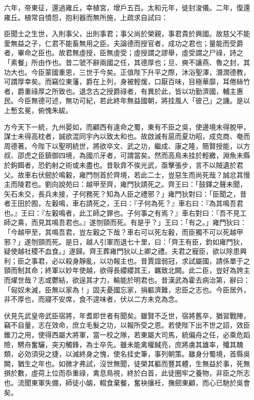 \begin{pinyinscope}
六年，帝東征，還過雍丘，幸植宮，增戶五百。太和元年，徙封浚儀。二年，復還雍丘。植常自憤怨，抱利器而無所施，上疏求自試曰：

臣聞士之生世，入則事父，出則事君；事父尚於榮親，事君貴於興國。故慈父不能愛無益之子，仁君不能畜無用之臣。夫論德而授官者，成功之君也；量能而受爵者，畢命之臣也。故君無虛授，臣無虛受；虛授謂之謬舉，虛受謂之尸祿，詩之「素餐」所由作也。昔二虢不辭兩國之任，其德厚也；旦、奭不讓燕、魯之封，其功大也。今臣蒙國重恩，三世于今矣。正值陛下升平之際，沐浴聖澤，潛潤德教，可謂厚幸矣。而竊位東藩，爵在上列，身被輕煖，口厭百味，目極華靡，耳倦絲竹者，爵重祿厚之所致也。退念古之授爵祿者，有異於此，皆以功勤濟國，輔主惠民。今臣無德可述，無功可紀，若此終年無益國朝，將挂風人「彼己」之譏。是以上慙玄冕，俯愧朱紱。

方今天下一統，九州晏如，而顧西有違命之蜀，東有不臣之吳，使邊境未得脫甲，謀士未得高枕者，誠欲混同宇內以致太和也。故啟滅有扈而夏功昭，成克商、奄而周德著。今陛下以聖明統世，將欲卒文、武之功，繼成、康之隆，簡賢授能，以方叔、邵虎之臣鎮御四境，為國爪牙者，可謂當矣。然而高鳥未挂於輕繳，淵魚未縣於鉤餌者，恐釣射之術或未盡也。昔耿弇不俟光武，亟擊張步，言不以賊遺於君父。故車右伏劒於鳴轂，雍門刎首於齊境，若此二士，豈惡生而尚死哉？誠忿其慢主而陵君也。劉向說苑曰：越甲至齊，雍門狄請死之。齊王曰：「鼓鐸之聲未聞，矢石未交，長兵未接，子何務死？知為人臣之禮邪？」雍門狄對曰：「臣聞之，昔者王田於囿，左轂鳴，車右請死之，王曰：『子何為死？』車右曰：『為其鳴吾君也。』王曰：『左轂鳴者，此工師之罪也。子何事之有焉？』車右對曰：『吾不見工師之乘，而見其鳴吾君也。』遂刎頸而死。有是乎？」王曰：「有之。」雍門狄曰：「今越甲至，其鳴吾君，豈左轂之下哉？車右可以死左轂，而臣獨不可以死越甲邪？」遂刎頸而死。是日，越人引軍而退七十里，曰：「齊王有臣，鈞如雍門狄，疑使越社稷不血食。」遂歸。齊王葬雍門狄以上卿之禮。夫君之寵臣，欲以除患興利；臣之事君，必以殺身靜亂，以功報主也。昔賈誼弱冠，求試屬國，請係單于之頸而制其命；終軍以妙年使越，欲得長纓纓其王，羈致北闕。此二臣，豈好為誇主而燿世哉？志或鬱結，欲逞其才力，輸能於明君也。昔漢武為霍去病治第，辭曰：「匈奴未滅，臣無以家為！」固夫憂國忘家，捐軀濟難，忠臣之志也。今臣居外，非不厚也，而寢不安席，食不遑味者，伏以二方未克為念。

伏見先武皇帝武臣宿將，年耆即世者有聞矣。雖賢不乏世，宿將舊卒，猶習戰陣，竊不自量，志在效命，庶立毛髮之功，以報所受之恩。若使陛下出不世之詔，效臣錐刀之用，使得西屬大將軍，當一校之隊，若東屬大司馬，統偏舟之任，必乘危蹈險，騁舟奮驪，突刃觸鋒，為士卒先。雖未能禽權馘亮，庶將虜其雄率，殲其醜類，必効須臾之捷，以滅終身之愧，使名挂史筆，事列朝策。雖身分蜀境，首縣吳闕，猶生之年也。如微才弗試，沒世無聞，徒榮其軀而豐其體，生無益於事，死無損於數，虛荷上位而忝重祿，禽息鳥視，終於白首，此徒圈牢之養物，非臣之所志也。流聞東軍失備，師徒小衂，輟食棄餐，奮袂攘衽，撫劒東顧，而心已馳於吳會矣。


\end{pinyinscope}
